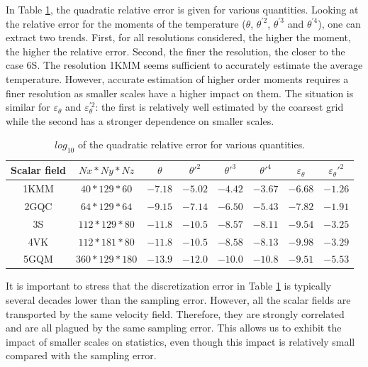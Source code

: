 \documentclass[review]{elsarticle}
\newcommand{\epst}{\varepsilon_\theta}
\begin{document}
In Table \ref{tb-error}, the quadratic relative error is given for various quantities. Looking at the relative error for the moments of the temperature ($\theta$, $\theta^{\prime2}$, $\theta^{\prime3}$ and $\theta^{\prime4}$), one can extract two trends. First, for all resolutions considered, the higher the moment, the higher the relative error. Second, the finer the resolution, the closer to the case 6S. The resolution 1KMM seems sufficient to accurately estimate the average temperature. However, accurate estimation of higher order moments requires a finer resolution as smaller scales have a higher impact on them. The situation is similar for $\epst$ and $\epst^{\prime2}$: the first is relatively well estimated by the coarsest grid while the second has a stronger dependence on smaller scales.

\begin{table}
\begin{center}
\begin{tabular}{|c|c|c|c|c|c|c|c|}
\hline
Scalar field & $Nx*Ny*Nz$ & $\theta$ & $\theta'^2$ & $\theta'^3$ & $\theta'^4$ & $\epst$ & $\epst'^2$ \\
\hline
1KMM & $40*129*60$ & $-7.18$ & $-5.02$ & $-4.42$ & $-3.67$ & $-6.68$ & $-1.26$ \\
\hline
2GQC & $64*129*64$ & $-9.15$ & $-7.14$ & $-6.50$ & $-5.43$ & $-7.82$ & $-1.91$ \\
\hline
3S & $112*129*80$ & $-11.8$ & $-10.5$ & $-8.57$ & $-8.11$ & $-9.54$ & $-3.25$ \\
\hline
4VK & $112*181*80$ & $-11.8$ & $-10.5$ & $-8.58$ & $-8.13$ & $-9.98$ & $-3.29$ \\
\hline
5GQM & $360*129*180$ & $-13.9$ & $-12.0$ & $-10.0$ & $-10.8$ & $-9.51$ & $-5.53$ \\
\hline
\end{tabular}
\end{center}
\caption{$log_{10}$ of the quadratic relative error for various quantities.}
\label{tb-error}
\end{table}

It is important to stress that the discretization error in Table \ref{tb-error} is typically several decades lower than the sampling error. However, all the scalar fields are transported by the same velocity field. Therefore, they are strongly correlated and are all plagued by the same sampling error. This allows us to exhibit the impact of smaller scales on statistics, even though this impact is relatively small compared with the sampling error.
\end{document}
